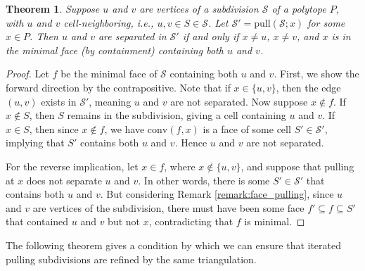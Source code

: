 \documentclass[12pt]{amsart}
\newtheorem{theorem}{Theorem}[section]
\theoremstyle{definition}
\newcommand\calS{\mathcal{S}}
\newcommand\conv{\mathrm{conv}}
\newcommand\pull{\mathrm{pull}}
\begin{document}
\begin{theorem}\label{thm:pulling1} 
Suppose $u$ and $v$ are vertices of a subdivision $\calS$ of a polytope $P$, with $u$ and $v$ cell-neighboring, i.e., $u,v \in S\in \calS$. 
Let $\calS' = \pull(\calS;x)$ for some $x\in P$.
Then $u$ and $v$ are separated in $\calS'$ if and only if $x\neq u$, $x\neq v$, and $x$ is in the minimal face (by containment) containing both $u$ and $v$.
\end{theorem}
    \begin{proof}
    Let $f$ be the minimal face of $\calS$ containing both $u$ and $v$.   
    First, we show the forward direction by the contrapositive. 
    Note that if $x\in\{u,v\}$, then the edge $(u,v)$ exists in $\calS'$, meaning $u$ and $v$ are not separated.
    Now suppose $x\notin f$.
        If $x\notin S$, then $S$ remains in the subdivision, giving a cell containing $u$ and $v$.
        If $x\in S$, then since $x\notin f$, we have $\conv(f,x)$ is a face of some cell $S'\in \calS'$, implying that $S'$ contains both $u$ and $v$.
        Hence $u$ and $v$ are not separated.

        For the reverse implication, let $x\in f$, where $x\notin \{u,v\}$, and suppose that pulling at $x$ does not separate $u$ and $v$.
        In other words, there is some $S'\in \calS'$ that contains both $u$ and $v$.
        But considering Remark \ref{remark:face_pulling}, since $u$ and $v$ are vertices of the subdivision, there must have been some face $f'\subseteq f\subseteq S'$ that contained $u$ and $v$ but not $x$, contradicting that $f$ is minimal.
    \end{proof}

The following theorem gives a condition by which we can ensure that iterated pulling subdivisions are refined by the same triangulation.
\end{document}
